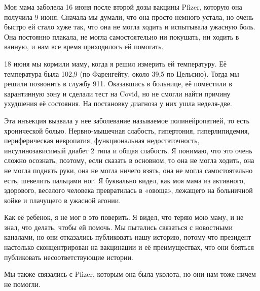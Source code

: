 Моя мама заболела 16 июня после второй дозы вакцины Pfizer, которую она получила
9 июня. Сначала мы думали, что она просто немного устала, но очень быстро ей
стало хуже так, что она не могла ходить и испытывала ужасную боль. Она постоянно
плакала, не могла самостоятельно ни покушать, ни ходить в ванную, и нам все
время приходилось ей помогать.

18 июня мы кормили маму, когда я решил измерить ей температуру. Её температура
была 102,9 (по Фаренгейту, около 39,5 по Цельсию). Тогда мы решили позвонить в
службу 911. Оказавшись в больнице, её поместили в карантинную зону и сделали
тест на Covid, но не смогли найти причину ухудшения её состояния. На постановку
диагноза у них ушла неделя-две.

Эта инъекция вызвала у нее заболевание называемое полинейропатией, то есть
хронической болью. Нервно-мышечная слабость, гипертония, гиперлипидемия,
периферическая невропатия, функциональная недостаточность, инсулинозависимый
диабет 2 типа и общая слабость. Я понимаю, что это очень сложно осознать,
поэтому, если сказать в основном, то она не могла ходить, она не могла поднять
руки, она не могла ничего взять, она не могла самостоятельно есть, шевелить
пальцами ног. Я буквально видел, как моя мама из активного, здорового, веселого
человека превратилась в «овоща», лежащего на больничной койке и плачущего в
ужасной агонии.

Как её ребенок, я не мог в это поверить. Я видел, что теряю мою маму, и не знал,
что делать, чтобы ей помочь. Мы пытались связаться с новостными каналами, но они
отказались публиковать нашу историю, потому что президент настолько
сконцентрирован на вакцинации и её преимуществах, что они бояться публиковать
несоответствующие истории.

Мы также связались с Pfizer, которым она была уколота, но они нам тоже ничем не
помогли.

